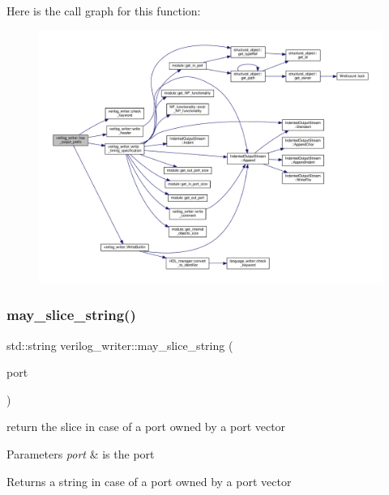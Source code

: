 Here is the call graph for this function\+:
\nopagebreak
\begin{figure}[H]
\begin{center}
\leavevmode
\includegraphics[width=350pt]{d8/dba/classverilog__writer_a33625c1b43ea1ee1fa7331cde5d83c8b_cgraph}
\end{center}
\end{figure}
\mbox{\label{classverilog__writer_a0dc813bd5493e6c2fd53c99d720eb958}} 
\subsubsection{\texorpdfstring{may\+\_\+slice\+\_\+string()}{may\_slice\_string()}}
{\footnotesize\ttfamily std\+::string verilog\+\_\+writer\+::may\+\_\+slice\+\_\+string (\begin{DoxyParamCaption}\item[{const \hyperlink{structural__objects_8hpp_a8ea5f8cc50ab8f4c31e2751074ff60b2}{structural\+\_\+object\+Ref} \&}]{port }\end{DoxyParamCaption})}



return the slice in case of a port owned by a port vector 


\begin{DoxyParams}{Parameters}
{\em port} & is the port \\
\hline
\end{DoxyParams}
\begin{DoxyReturn}{Returns}
a string in case of a port owned by a port vector 
\end{DoxyReturn}



